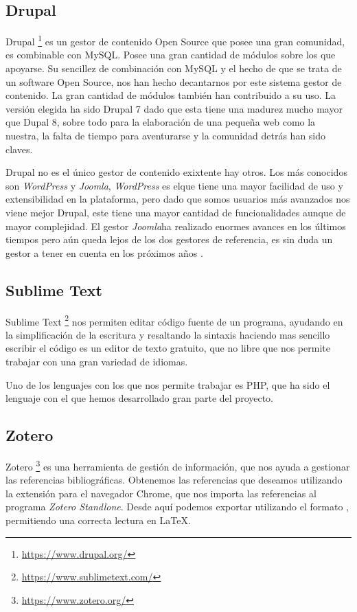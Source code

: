 \subsection{Drupal}
Drupal \footnote{\url{https://www.drupal.org/}} es un gestor de contenido Open Source que posee una gran comunidad, es combinable con MySQL. Posee una gran cantidad de módulos sobre los que apoyarse.
Su sencillez de combinación con MySQL y el hecho de que se trata de un software Open Source, nos han hecho decantarnos por este sistema gestor de contenido. La gran cantidad de módulos también han contribuido a su uso.
La versión elegida ha sido Drupal 7 dado que esta tiene una madurez mucho mayor que Dupal 8, sobre todo para la elaboración de una pequeña web como la nuestra, la falta de tiempo para aventurarse y la comunidad detrás han sido claves.

Drupal no es el único gestor de contenido exixtente hay otros. Los más conocidos son \textit{WordPress} y \textit{Joomla}, \textit{WordPress} es elque tiene una mayor facilidad de uso y extensibilidad en la plataforma, pero dado que somos usuarios más avanzados nos viene mejor Drupal, este tiene una mayor cantidad de funcionalidades aunque de mayor complejidad. El gestor \textit{Joomla}ha realizado enormes avances en los últimos tiempos pero aún queda lejos de los dos gestores de referencia, es sin duda un gestor a tener en cuenta en los próximos años \cite{comparacion_cms_2016}.

\subsection{Sublime Text}

Sublime Text \footnote{\url{https://www.sublimetext.com/}} nos permiten editar código fuente de un programa, ayudando en la simplificación de la escritura y resaltando la sintaxis haciendo mas sencillo escribir el código es un editor de texto gratuito, que no libre que nos permite trabajar con una gran variedad de idiomas\cite{wiki:sublime_text}.

Uno de los lenguajes con los que nos permite trabajar es PHP, que ha sido el lenguaje con el que hemos desarrollado gran parte del proyecto.

\subsection{Zotero}

Zotero \footnote{\url{https://www.zotero.org/}} es una herramienta de gestión de información, que nos ayuda a gestionar las referencias bibliográficas. Obtenemos las referencias que deseamos utilizando la extensión para el navegador Chrome, que nos importa las referencias al programa \textit{Zotero Standlone}. Desde aquí podemos exportar utilizando el formato , permitiendo una correcta lectura en \LaTeX.

